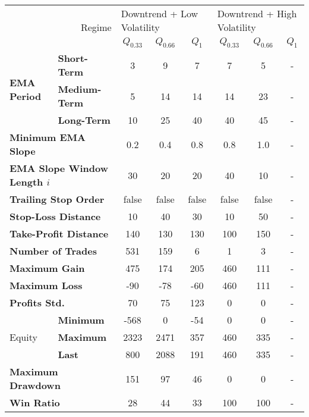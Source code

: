 \centering
\begin{tabular}{ll|cccccc}
    \toprule
    \multicolumn{2}{r|}{\multirow{2}{*}{Regime}} & \multicolumn{3}{l}{Downtrend + Low Volatility}   & \multicolumn{3}{l}{Downtrend + High Volatility}   \\
    \multicolumn{2}{r|}{} & $Q_{0.33}$ & $Q_{0.66}$ & $Q_{1}$ & $Q_{0.33}$ & $Q_{0.66}$ & $Q_{1}$ \\
    \midrule
    \multirow{3}{*}{\textbf{EMA Period}} & \textbf{Short-Term}  & 3    & 9    & 7   & 7   & 5   & - \\
    & \textbf{Medium-Term} & 5    & 14   & 14  & 14  & 23  & - \\
    & \textbf{Long-Term}   & 10   & 25   & 40  & 40  & 45  & - \\
    \multicolumn{2}{l|}{\textbf{Minimum EMA Slope}} & 0.2 & 0.4 & 0.8 & 0.8 & 1.0 & - \\
    \multicolumn{2}{l|}{\textbf{EMA Slope Window Length $i$}} & 30 & 20 & 20 & 40 & 10 & - \\
    \multicolumn{2}{l|}{\textbf{Trailing Stop Order}} & false & false & false & false & false & - \\
    \multicolumn{2}{l|}{\textbf{Stop-Loss Distance}} & 10 & 40 & 30 & 10 & 50 & - \\
    \multicolumn{2}{l|}{\textbf{Take-Profit Distance}} & 140 & 130 & 130 & 100 & 150 & - \\
    \midrule
    \multicolumn{2}{l|}{\textbf{Number of Trades}} & 531 & 159 & 6 & 1 & 3 & - \\
    \multicolumn{2}{l|}{\textbf{Maximum Gain}} & 475 & 174 & 205 & 460 & 111 & - \\
    \multicolumn{2}{l|}{\textbf{Maximum Loss}} & -90 & -78 & -60 & 460 & 111 & - \\
    \multicolumn{2}{l|}{\textbf{Profits Std.}} & 70 & 75 & 123 & 0 & 0 & - \\
    \multirow{3}{*}{Equity}              & \textbf{Minimum}     & -568 & 0    & -54 & 0   & 0   & - \\
    & \textbf{Maximum}     & 2323 & 2471 & 357 & 460 & 335 & - \\
    & \textbf{Last}        & 800  & 2088 & 191 & 460 & 335 & - \\
    \multicolumn{2}{l|}{\textbf{Maximum Drawdown}} & 151 & 97 & 46 & 0 & 0 & - \\
    \multicolumn{2}{l|}{\textbf{Win Ratio}} & 28 & 44 & 33 & 100 & 100 & - \\
    \bottomrule
\end{tabular}